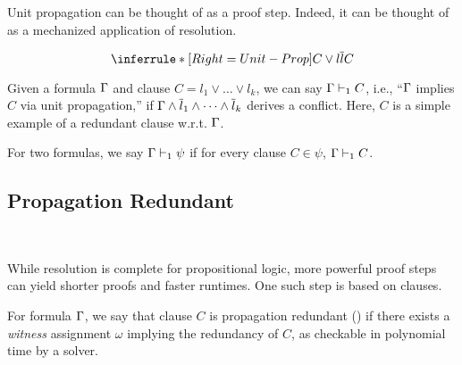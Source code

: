 Unit propagation can be thought of as a proof step. Indeed, it can be thought of as a mechanized application of resolution.

\begin{equation*}
    \inferrule*[Right=Unit-Prop]{
        C \lor l \\ \overline{l}
    }{
        C
    }
\end{equation*}

Given a formula $\Gamma$ and clause $C = l_1 \lor \dots \lor l_k$, we can say $\Gamma \vdash_1 C$, i.e., ``$\Gamma$ implies $C$ via unit propagation,'' if $\Gamma \land \overline{l}_1 \land \dots \land \overline{l}_k$ derives a conflict. Here, $C$ is a simple example of a redundant clause w.r.t. $\Gamma$. 








For two formulas, we say $\Gamma \vdash_1 \psi$ if for every clause $C \in \psi$, $\Gamma \vdash_1 C$. 


\subsection{Propagation Redundant}~\label{subsec:pr}

While resolution is complete for propositional logic, more powerful proof steps can yield shorter proofs and faster runtimes. One such step is based on \pr clauses.

\begin{definition}
    For formula $\Gamma$, we say that clause $C$ is propagation redundant (\pr) if there exists a \emph{witness} assignment $\omega$ implying the redundancy of $C$, as checkable in polynomial time by a solver. 
\end{definition}

